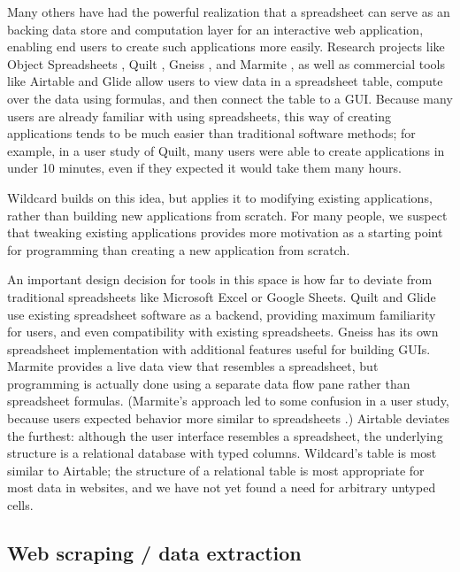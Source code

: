 \documentclass[english,submission]{programming}
\begin{document}
Many others have had the powerful realization that a spreadsheet can
serve as an backing data store and computation layer for an interactive
web application, enabling end users to create such applications more
easily. Research projects like Object Spreadsheets
\autocite{mccutchen2016}, Quilt \autocite{benson2014}, Gneiss
\autocite{chang2014}, and Marmite \autocite{wong2007}, as well as
commercial tools like Airtable \autocite{zotero-79} and Glide
\autocite{zotero-81} allow users to view data in a spreadsheet table,
compute over the data using formulas, and then connect the table to a
GUI. Because many users are already familiar with using spreadsheets,
this way of creating applications tends to be much easier than
traditional software methods; for example, in a user study of Quilt,
many users were able to create applications in under 10 minutes, even if
they expected it would take them many hours.

Wildcard builds on this idea, but applies it to modifying existing
applications, rather than building new applications from scratch. For
many people, we suspect that tweaking existing applications provides
more motivation as a starting point for programming than creating a new
application from scratch.

An important design decision for tools in this space is how far to
deviate from traditional spreadsheets like Microsoft Excel or Google
Sheets. Quilt and Glide use existing spreadsheet software as a backend,
providing maximum familiarity for users, and even compatibility with
existing spreadsheets. Gneiss has its own spreadsheet implementation
with additional features useful for building GUIs. Marmite provides a
live data view that resembles a spreadsheet, but programming is actually
done using a separate data flow pane rather than spreadsheet formulas.
(Marmite's approach led to some confusion in a user study, because users
expected behavior more similar to spreadsheets \autocite{wong2007}.)
Airtable deviates the furthest: although the user interface resembles a
spreadsheet, the underlying structure is a relational database with
typed columns. Wildcard's table is most similar to Airtable; the
structure of a relational table is most appropriate for most data in
websites, and we have not yet found a need for arbitrary untyped cells.

\hypertarget{web-scraping-data-extraction}{%
\subsection{Web scraping / data
extraction}\label{web-scraping-data-extraction}}
\end{document}
